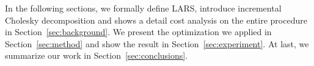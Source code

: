 In the following sections, we formally define LARS, introduce incremental Cholesky decomposition and shows a detail cost analysis on the entire procedure in Section~\ref{sec:background}.
We present the optimization we applied in Section~\ref{sec:method} and show the result in Section~\ref{sec:experiment}. At last, we summarize our work in Section~\ref{sec:conclusions}.






 
 
 
 
